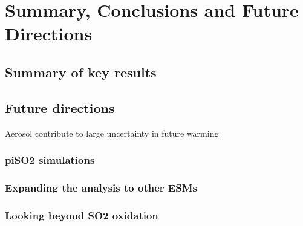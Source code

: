 \chapter{Summary, Conclusions and Future Directions}
\ifpdf
    \graphicspath{{Chapter6/Figs/Raster/}{Chapter6/Figs/PDF/}{Chapter6/Figs/}}
\else
    \graphicspath{{Chapte6/Figs/Vector/}{Chapter6/Figs/}}
\fi


\section{Summary of key results}

\section{Future directions}

Aerosol contribute to large uncertainty in future warming \citep{parrisLargeUncertaintyFuture2022,wilcoxRegionalAerosolModel2022}

\subsection{piSO2 simulations}

\subsection{Expanding the analysis to other ESMs}


\subsection{Looking beyond SO2 oxidation}



